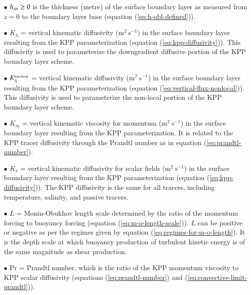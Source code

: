 \begin{trivlist}
\item[$\bullet$] $h_{\mbox{\tiny obl}} \ge 0$ is the thickness (metre) of the
  surface boundary layer as measured from $z=0$ to the boundary layer
  base (equation (\ref{eq:h-obl-defined})).

\item[$\bullet$] $K_{\lambda}$ = vertical kinematic diffusivity
  ($\mbox{m}^{2}~\mbox{s}^{-1}$) in the surface boundary layer
  resulting from the KPP parameterization (equation
  (\ref{eq:kpp-diffusivity})).  This diffusivity is used to
  parameterize the downgradient diffusive portion of the KPP boundary
  layer scheme.

\item[$\bullet$] $K^{\mbox{\tiny non-local}}_{\lambda}$ = vertical
  kinematic diffusivity ($\mbox{m}^{2}~\mbox{s}^{-1}$) in the surface
  boundary layer resulting from the KPP parameterization (equation
  (\ref{eq:vertical-flux-nonlocal})).  This diffusivity is used to
  parameterize the non-local portion of the KPP boundary layer scheme.

\item[$\bullet$] $K_{m}$ = vertical kinematic viscosity for momentum
  ($\mbox{m}^{2}~\mbox{s}^{-1}$) in the surface boundary layer
  resulting from the KPP parameterization.  It is related to the KPP
  tracer diffusivity through the Prandtl number as in equation
  (\ref{eq:prandtl-number}).

\item[$\bullet$] $K_{s}$ = vertical kinematic diffusivity for scalar
  fields ($\mbox{m}^{2}~\mbox{s}^{-1}$) in the surface boundary layer
  resulting from the KPP parameterization (equation
  (\ref{eq:kpp-diffusivity})).  The KPP diffusivity is the same for
  all tracers, including temperature, salinity, and passive tracers.

\item[$\bullet$] $L$ = Monin-Obukhov length scale determined by the
  ratio of the momentum forcing to buoyancy forcing (equation
  (\ref{eq:m-o-length-scale})).  $L$ can be positive or negative as
  per the regimes given by equation (\ref{eq:regimes-for-m-o-length}).
  It is the depth scale at which buoyancy production of turbulent
  kinetic energy is of the same magnitude as shear production.

\item[$\bullet$] $\mbox{Pr}$ = Prandtl number, which is the ratio of
  the KPP momentum viscosity to KPP scalar diffusivity (equations
  (\ref{eq:prandtl-number}) and (\ref{eq:convective-limit-prandtl})).


\end{trivlist}
